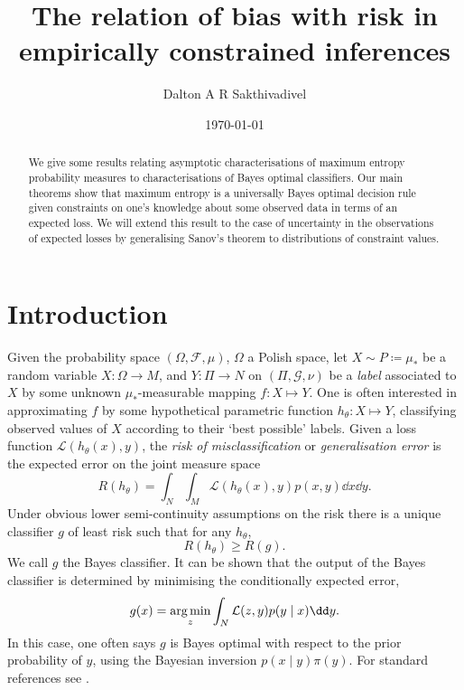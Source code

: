 \documentclass[11pt]{amsart}
\title{The relation of bias with risk in empirically constrained inferences}
\author{Dalton A R Sakthivadivel}
\date{\today}
\numberwithin{equation}{section}
\theoremstyle{remark}
\theoremstyle{remark}
\newcommand{\lag}{\mathcal{L}}
\DeclareMathOperator*{\argmin}{\text{arg\,min}}
\newcommand{\F}{\mathscr{F}}
\begin{document}
\begin{abstract}

We give some results relating asymptotic characterisations of maximum entropy probability measures to characterisations of Bayes optimal classifiers. Our main theorems show that maximum entropy is a universally Bayes optimal decision rule given constraints on one's knowledge about some observed data in terms of an expected loss. We will extend this result to the case of uncertainty in the observations of expected losses by generalising Sanov's theorem to distributions of constraint values. %

\end{abstract}


\maketitle

\section{Introduction}

Given the probability space $(\Omega, \F, \mu)$, $\Omega$ a Polish space, let $X \sim P \coloneqq \mu_*$ be a random variable $X \colon \Omega \to M$, and $Y \colon \Pi \to N$ on $(\Pi, \mathscr{G}, \nu)$ be a {\it label} associated to $X$ by some unknown $\mu_*$-measurable %
mapping $f \colon X \mapsto Y$. One is often interested in approximating $f$ by some hypothetical parametric function $h_\theta \colon X \mapsto Y$, classifying observed values of $X$ according to their `best possible' labels. Given a loss function $\lag(h_\theta(x), y)$, the {\it risk of misclassification} or {\it generalisation error} is the expected error on the joint measure space
\[
    R(h_\theta) = \int_N\int_M \lag(h_\theta(x), y) p(x, y) \dd x \dd y.
\]
Under obvious lower semi-continuity assumptions on the risk there is a unique classifier $g$ of least risk such that for any $h_\theta$, 
\[
    R(h_\theta) \geqslant R(g).
\]
We call $g$ the Bayes classifier. It can be shown that the output of the Bayes classifier is determined by minimising the conditionally expected error,
\begin{equation}\label{expected-error}
    g(x) = \argmin_z \int_N \lag(z, y) p(y \mid x) \dd y.
\end{equation} 
In this case, one often says $g$ is Bayes optimal with respect to the prior probability of $y$, using the Bayesian inversion $p(x \mid y)\pi(y)$. For standard references see \cite{berger2013statistical, mackay2003information, shalev2014understanding}.
\end{document}
